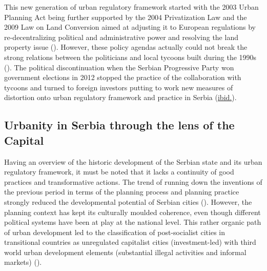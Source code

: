 \documentclass[11pt]{report}
\begin{document}
This new generation of urban regulatory framework started with the 2003 Urban Planning Act being further supported by the 2004 Privatization Law and the 2009 Law on Land Conversion aimed at adjusting it to European regulations by re-decentralizing political and administrative power and resolving the land property issue (\href{Cagic}{\citealt{cagic_zakoni_2014}}). However, these policy agendas actually could not break the strong relations between the politicians and local tycoons built during the 1990s  (\href{Peric}{\citealt{peric_evolution_2016}}).
The political discontinuation when the Serbian Progressive Party won government elections in 2012 stopped the practice of the collaboration with tycoons and turned to foreign investors putting to work new measures of distortion onto urban regulatory framework and practice in Serbia (\href{Peric}{ibid.}).
            
\subsection{Urbanity in Serbia through the lens of the Capital}

Having an overview of the historic development of the Serbian state and its urban regulatory framework, it must be noted that it lacks a continuity of good practices and transformative actions. The trend of running down the inventions of the previous period in terms of the planning process and planning practice strongly reduced the developmental potential of Serbian cities (\href{Peric}{\citealt{peric_evolution_2016}}). However, the planning context has kept its culturally moulded coherence, even though different political systems have been at play at the national level.
This rather organic path of urban development led to the classification of post-socialist cities in transitional countries as unregulated capitalist cities (investment-led) with third world urban development elements (substantial illegal activities and informal markets) (\href{Petrovic}{\citealt{petrovic_cities_2009}}).
\\ 
\end{document}
